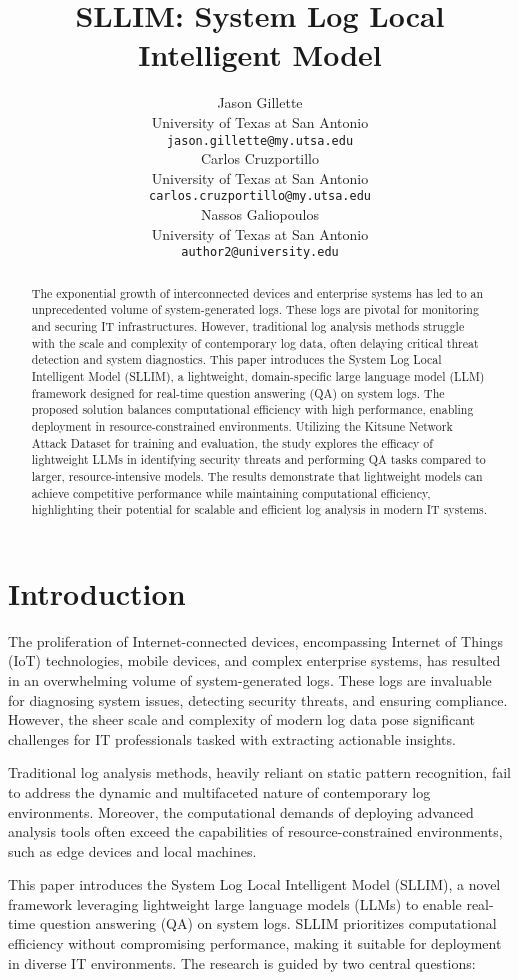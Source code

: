 \documentclass[11pt]{article}
\title{SLLIM: System Log Local Intelligent Model}
\author{Jason Gillette \\
  University of Texas at San Antonio \\
  \texttt{jason.gillette@my.utsa.edu} \\\And
  Carlos Cruzportillo \\
  University of Texas at San Antonio \\
  \texttt{carlos.cruzportillo@my.utsa.edu} \\\And
  Nassos Galiopoulos \\
  University of Texas at San Antonio \\
  \texttt{author2@university.edu} \\
}
\begin{document}
\maketitle

\begin{abstract}
The exponential growth of interconnected devices and enterprise systems has led to an unprecedented volume of system-generated logs. These logs are pivotal for monitoring and securing IT infrastructures. However, traditional log analysis methods struggle with the scale and complexity of contemporary log data, often delaying critical threat detection and system diagnostics. This paper introduces the System Log Local Intelligent Model (SLLIM), a lightweight, domain-specific large language model (LLM) framework designed for real-time question answering (QA) on system logs. The proposed solution balances computational efficiency with high performance, enabling deployment in resource-constrained environments. Utilizing the Kitsune Network Attack Dataset for training and evaluation, the study explores the efficacy of lightweight LLMs in identifying security threats and performing QA tasks compared to larger, resource-intensive models. The results demonstrate that lightweight models can achieve competitive performance while maintaining computational efficiency, highlighting their potential for scalable and efficient log analysis in modern IT systems.
\end{abstract}
\section{Introduction}
The proliferation of Internet-connected devices, encompassing Internet of Things (IoT) technologies, mobile devices, and complex enterprise systems, has resulted in an overwhelming volume of system-generated logs. These logs are invaluable for diagnosing system issues, detecting security threats, and ensuring compliance. However, the sheer scale and complexity of modern log data pose significant challenges for IT professionals tasked with extracting actionable insights.

Traditional log analysis methods, heavily reliant on static pattern recognition, fail to address the dynamic and multifaceted nature of contemporary log environments. Moreover, the computational demands of deploying advanced analysis tools often exceed the capabilities of resource-constrained environments, such as edge devices and local machines.

This paper introduces the System Log Local Intelligent Model (SLLIM), a novel framework leveraging lightweight large language models (LLMs) to enable real-time question answering (QA) on system logs. SLLIM prioritizes computational efficiency without compromising performance, making it suitable for deployment in diverse IT environments. The research is guided by two central questions:
\end{document}

